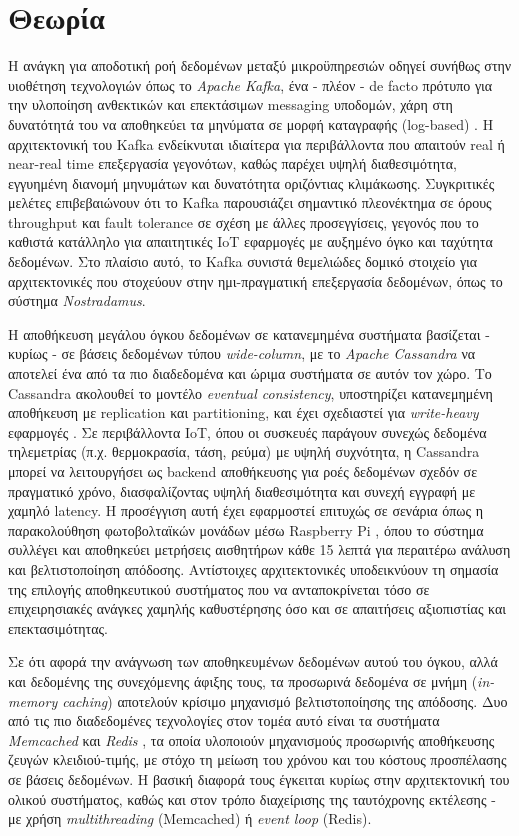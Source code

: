 \chapter{Θεωρία}

Η ανάγκη για αποδοτική ροή δεδομένων μεταξύ μικροϋπηρεσιών οδηγεί συνήθως στην υιοθέτηση τεχνολογιών όπως το \textit{Apache Kafka}, ένα - πλέον - de facto πρότυπο για την υλοποίηση ανθεκτικών και επεκτάσιμων messaging υποδομών, χάρη στη δυνατότητά του να αποθηκεύει τα μηνύματα σε μορφή καταγραφής (log-based) \cite{kafkabdd}. Η αρχιτεκτονική του Kafka ενδείκνυται ιδιαίτερα για περιβάλλοντα που απαιτούν real ή near-real time επεξεργασία γεγονότων, καθώς παρέχει υψηλή διαθεσιμότητα, εγγυημένη διανομή μηνυμάτων και δυνατότητα οριζόντιας κλιμάκωσης. Συγκριτικές μελέτες \cite{rtkafka} επιβεβαιώνουν ότι το Kafka παρουσιάζει σημαντικό πλεονέκτημα σε όρους throughput και fault tolerance σε σχέση με άλλες προσεγγίσεις, γεγονός που το καθιστά κατάλληλο για απαιτητικές IoT εφαρμογές με αυξημένο όγκο και ταχύτητα δεδομένων. Στο πλαίσιο αυτό, το Kafka συνιστά θεμελιώδες δομικό στοιχείο για αρχιτεκτονικές που στοχεύουν στην ημι-πραγματική επεξεργασία δεδομένων, όπως το σύστημα \textit{Nostradamus}.

Η αποθήκευση μεγάλου όγκου δεδομένων σε κατανεμημένα συστήματα βασίζεται - κυρίως - σε βάσεις δεδομένων τύπου \textit{wide-column}, με το \textit{Apache Cassandra} να αποτελεί ένα από τα πιο διαδεδομένα και ώριμα συστήματα σε αυτόν τον χώρο. Το Cassandra ακολουθεί το μοντέλο \textit{eventual consistency}, υποστηρίζει κατανεμημένη αποθήκευση με replication και partitioning, και έχει σχεδιαστεί για \textit{write-heavy} εφαρμογές \cite{cassandrawp}. Σε περιβάλλοντα IoT, όπου οι συσκευές παράγουν συνεχώς δεδομένα τηλεμετρίας (π.χ. θερμοκρασία, τάση, ρεύμα) με υψηλή συχνότητα, η Cassandra μπορεί να λειτουργήσει ως backend αποθήκευσης για ροές δεδομένων σχεδόν σε πραγματικό χρόνο, διασφαλίζοντας υψηλή διαθεσιμότητα και συνεχή εγγραφή με χαμηλό latency. Η προσέγγιση αυτή έχει εφαρμοστεί επιτυχώς σε σενάρια όπως η παρακολούθηση φωτοβολταϊκών μονάδων μέσω Raspberry Pi \cite{iotcassandra}, όπου το σύστημα συλλέγει και αποθηκεύει μετρήσεις αισθητήρων κάθε 15 λεπτά για περαιτέρω ανάλυση και βελτιστοποίηση απόδοσης. Αντίστοιχες αρχιτεκτονικές υποδεικνύουν τη σημασία της επιλογής αποθηκευτικού συστήματος που να ανταποκρίνεται τόσο σε επιχειρησιακές ανάγκες χαμηλής καθυστέρησης όσο και σε απαιτήσεις αξιοπιστίας και επεκτασιμότητας.

Σε ότι αφορά την ανάγνωση των αποθηκευμένων δεδομένων αυτού του όγκου, αλλά και δεδομένης της συνεχόμενης άφιξης τους, τα προσωρινά δεδομένα σε μνήμη (\textit{in-memory caching}) αποτελούν κρίσιμο μηχανισμό βελτιστοποίησης της απόδοσης. Δυο από τις πιο διαδεδομένες τεχνολογίες στον τομέα αυτό είναι τα συστήματα \textit{Memcached} \cite{memcachedfb} και \textit{Redis} \cite{redisia}, τα οποία υλοποιούν μηχανισμούς προσωρινής αποθήκευσης ζευγών κλειδιού-τιμής, με στόχο τη μείωση του χρόνου και του κόστους προσπέλασης σε βάσεις δεδομένων. Η βασική διαφορά τους έγκειται κυρίως στην αρχιτεκτονική του ολικού συστήματος, καθώς και στον τρόπο διαχείρισης της ταυτόχρονης εκτέλεσης - με χρήση \textit{multithreading} (Memcached) ή \textit{event loop} (Redis).

